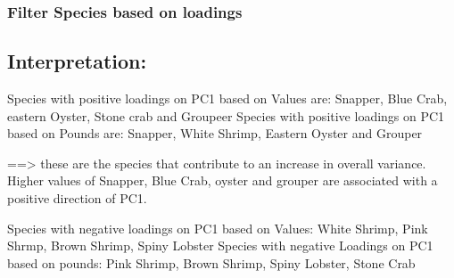\documentclass[
  letterpaper,
  DIV=11,
  numbers=noendperiod]{scrartcl}
\newenvironment{Shaded}{\begin{snugshade}}{\end{snugshade}}
\newcommand{\AttributeTok}[1]{\textcolor[rgb]{0.40,0.45,0.13}{#1}}
\newcommand{\CommentTok}[1]{\textcolor[rgb]{0.37,0.37,0.37}{#1}}
\newcommand{\DecValTok}[1]{\textcolor[rgb]{0.68,0.00,0.00}{#1}}
\newcommand{\FunctionTok}[1]{\textcolor[rgb]{0.28,0.35,0.67}{#1}}
\newcommand{\NormalTok}[1]{\textcolor[rgb]{0.00,0.23,0.31}{#1}}
\newcommand{\OtherTok}[1]{\textcolor[rgb]{0.00,0.23,0.31}{#1}}
\newcommand{\SpecialCharTok}[1]{\textcolor[rgb]{0.37,0.37,0.37}{#1}}
\newcommand{\StringTok}[1]{\textcolor[rgb]{0.13,0.47,0.30}{#1}}
\begin{document}
\hypertarget{filter-species-based-on-loadings}{%
\subsubsection{Filter Species based on
loadings}\label{filter-species-based-on-loadings}}

\hypertarget{interpretation}{%
\subsection{Interpretation:}\label{interpretation}}

Species with positive loadings on PC1 based on Values are: Snapper, Blue
Crab, eastern Oyster, Stone crab and Groupeer Species with positive
loadings on PC1 based on Pounds are: Snapper, White Shrimp, Eastern
Oyster and Grouper

==\textgreater{} these are the species that contribute to an increase in
overall variance. Higher values of Snapper, Blue Crab, oyster and
grouper are associated with a positive direction of PC1.

Species with negative loadings on PC1 based on Values: White Shrimp,
Pink Shrmp, Brown Shrimp, Spiny Lobster Species with negative Loadings
on PC1 based on pounds: Pink Shrimp, Brown Shrimp, Spiny Lobster, Stone
Crab

\begin{Shaded}
\end{Shaded}
\end{document}
